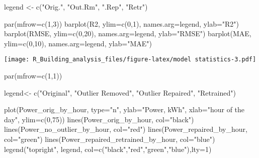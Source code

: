 \documentclass[
]{article}
\newenvironment{Shaded}{\begin{snugshade}}{\end{snugshade}}
\newcommand{\AttributeTok}[1]{\textcolor[rgb]{0.77,0.63,0.00}{#1}}
\newcommand{\DecValTok}[1]{\textcolor[rgb]{0.00,0.00,0.81}{#1}}
\newcommand{\FunctionTok}[1]{\textcolor[rgb]{0.00,0.00,0.00}{#1}}
\newcommand{\NormalTok}[1]{#1}
\newcommand{\OtherTok}[1]{\textcolor[rgb]{0.56,0.35,0.01}{#1}}
\newcommand{\StringTok}[1]{\textcolor[rgb]{0.31,0.60,0.02}{#1}}
\begin{document}
\begin{Shaded}
\begin{Highlighting}[]
\NormalTok{legend }\OtherTok{\textless{}{-}} \FunctionTok{c}\NormalTok{(}\StringTok{"Orig."}\NormalTok{, }\StringTok{"Out.Rm"}\NormalTok{, }\StringTok{".Rep"}\NormalTok{, }\StringTok{"Retr"}\NormalTok{)}

\FunctionTok{par}\NormalTok{(}\AttributeTok{mfrow=}\FunctionTok{c}\NormalTok{(}\DecValTok{1}\NormalTok{,}\DecValTok{3}\NormalTok{))}
\FunctionTok{barplot}\NormalTok{(R2,     }\AttributeTok{ylim=}\FunctionTok{c}\NormalTok{(}\DecValTok{0}\NormalTok{,}\DecValTok{1}\NormalTok{),     }\AttributeTok{names.arg=}\NormalTok{legend,     }\AttributeTok{ylab=}\StringTok{"R2"}\NormalTok{)}
\FunctionTok{barplot}\NormalTok{(RMSE,   }\AttributeTok{ylim=}\FunctionTok{c}\NormalTok{(}\DecValTok{0}\NormalTok{,}\DecValTok{20}\NormalTok{),    }\AttributeTok{names.arg=}\NormalTok{legend,     }\AttributeTok{ylab=}\StringTok{"RMSE"}\NormalTok{)}
\FunctionTok{barplot}\NormalTok{(MAE,    }\AttributeTok{ylim=}\FunctionTok{c}\NormalTok{(}\DecValTok{0}\NormalTok{,}\DecValTok{10}\NormalTok{),    }\AttributeTok{names.arg=}\NormalTok{legend,     }\AttributeTok{ylab=}\StringTok{"MAE"}\NormalTok{)}
\end{Highlighting}
\end{Shaded}

\texttt{[image: R\_Building\_analysis\_files/figure-latex/model statistics-3.pdf]}

\begin{Shaded}
\begin{Highlighting}[]
\FunctionTok{par}\NormalTok{(}\AttributeTok{mfrow=}\FunctionTok{c}\NormalTok{(}\DecValTok{1}\NormalTok{,}\DecValTok{1}\NormalTok{))}

\NormalTok{legend}\OtherTok{\textless{}{-}} \FunctionTok{c}\NormalTok{(}\StringTok{"Original"}\NormalTok{, }\StringTok{"Outlier Removed"}\NormalTok{, }\StringTok{"Outlier Repaired"}\NormalTok{, }\StringTok{"Retrained"}\NormalTok{)}

\FunctionTok{plot}\NormalTok{(Power\_orig\_by\_hour, }\AttributeTok{type=}\StringTok{"n"}\NormalTok{, }\AttributeTok{ylab=}\StringTok{"Power, kWh"}\NormalTok{, }\AttributeTok{xlab=}\StringTok{"hour of the day"}\NormalTok{, }\AttributeTok{ylim=}\FunctionTok{c}\NormalTok{(}\DecValTok{0}\NormalTok{,}\DecValTok{75}\NormalTok{))}
\FunctionTok{lines}\NormalTok{(Power\_orig\_by\_hour, }\AttributeTok{col=}\StringTok{"black"}\NormalTok{)}
\FunctionTok{lines}\NormalTok{(Power\_no\_outlier\_by\_hour, }\AttributeTok{col=}\StringTok{"red"}\NormalTok{)}
\FunctionTok{lines}\NormalTok{(Power\_repaired\_by\_hour, }\AttributeTok{col=}\StringTok{"green"}\NormalTok{)}
\FunctionTok{lines}\NormalTok{(Power\_repaired\_retrained\_by\_hour, }\AttributeTok{col=}\StringTok{"blue"}\NormalTok{)}
\FunctionTok{legend}\NormalTok{(}\StringTok{"topright"}\NormalTok{, legend, }\AttributeTok{col=}\FunctionTok{c}\NormalTok{(}\StringTok{"black"}\NormalTok{,}\StringTok{"red"}\NormalTok{,}\StringTok{"green"}\NormalTok{,}\StringTok{"blue"}\NormalTok{),}\AttributeTok{lty=}\DecValTok{1}\NormalTok{)}
\end{Highlighting}
\end{Shaded}
\end{document}
